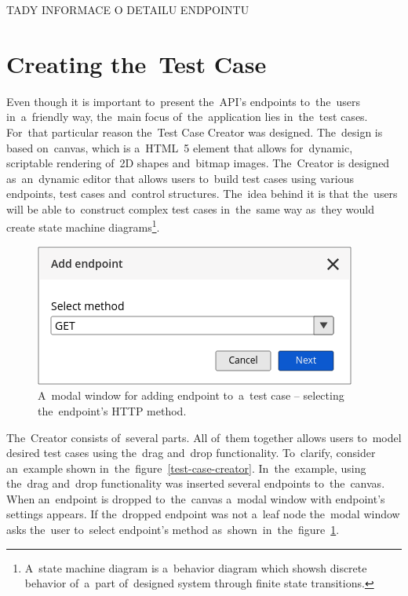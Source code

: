 
TADY INFORMACE O DETAILU ENDPOINTU


\section{Creating the~Test Case}
Even though it is important to~present the~API's endpoints to~the~users
in~a~friendly way, the~main focus of~the~application lies in~the~test cases.
For~that particular reason the~Test Case Creator was designed. The~design is
based on~canvas, which is a~HTML~5 element that allows for~dynamic, scriptable
rendering of~2D shapes and~bitmap images. The~Creator is designed as~an~dynamic
editor that allows users to~build test cases using various endpoints, test cases
and~control structures. The~idea behind it is that the~users will be able
to~construct complex test cases in~the~same way as~they would create state
machine diagrams\footnote{A~state machine diagram is a~behavior diagram which
showsh discrete behavior of~a~part of~designed system through finite state
transitions.}.

\begin{figure}[!hbt]
	\centering
	\includegraphics[scale=0.4]{./designs/drafts-1.0/add-endpoint-1.png}
	\caption{A~modal window for adding endpoint to~a~test case -- selecting
	the~endpoint's HTTP method.}
	\label{add-endpoint-1}
\end{figure}

The~Creator consists of~several parts. All of~them together allows users
to~model desired test cases using the~drag and~drop functionality. To~clarify,
consider an~example shown in~the~figure~\ref{test-case-creator}. In~the~example,
using the~drag and~drop functionality was inserted several endpoints
to~the~canvas. When an~endpoint is dropped to~the~canvas a~modal window with
endpoint's settings appears. If the~dropped endpoint was not a~leaf node
the~modal window asks the~user to~select endpoint's method
as~shown~in~the~figure~\ref{add-endpoint-1}.


